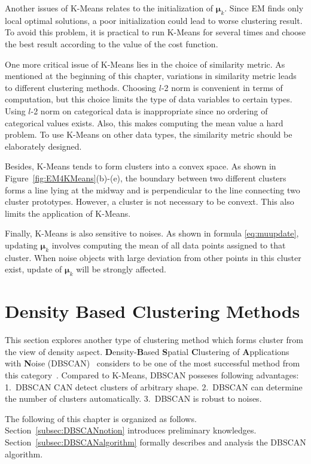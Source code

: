 Another issues of K-Means relates to the initialization of \(\boldsymbol{\mu}_k\). Since EM finds only local optimal solutions, a poor initialization could lead to worse clustering result. To avoid this problem, it is practical to run K-Means for several times and choose the best result according to the value of the cost function.

One more critical issue of K-Means lies in the choice of similarity metric. As mentioned at the beginning of this chapter, variations in similarity metric leads to different clustering methods. Choosing \(l\)-2 norm is convenient in terms of computation, but this choice limits the type of data variables to certain types. Using \(l\)-2 norm on categorical data is inappropriate since no ordering of categorical values exists. Also, this makes computing the mean value a hard problem. To use K-Means on other data types, the similarity metric should be elaborately designed. 

Besides, K-Means tends to form clusters into a convex space. As shown in Figure~\ref{fig:EM4KMeans}(b)-(e), the boundary between two different clusters forms a line lying at the midway and is perpendicular to the line connecting two cluster prototypes. However, a cluster is not necessary to be convext. This also limits the application of K-Means.

Finally, K-Means is also sensitive to noises. As shown in formula \ref{eq:muupdate}, updating \(\boldsymbol{\mu}_k\) involves computing the mean of all data points assigned to that cluster. When noise objects with large deviation from other points in this cluster exist, update of \(\boldsymbol{\mu}_k\) will be strongly affected. 

\section{Density Based Clustering Methods}
This section explores another type of clustering method which forms cluster from the view of density aspect. \textbf{D}ensity-\textbf{B}ased \textbf{S}patial \textbf{C}lustering of \textbf{A}pplications with \textbf{N}oise (DBSCAN)~\cite{ester1996density} considers to be one of the most successful method from this category~\cite{2014timeaward}. Compared to K-Means, DBSCAN posseses following advantages: 1.\ DBSCAN CAN detect clusters of arbitrary shape. 2.\ DBSCAN can determine the number of clusters automatically. 3.\ DBSCAN is robust to noises. 

The following of this chapter is organized as follows. Section~\ref{subsec:DBSCANnotion} introduces preliminary knowledges. Section~\ref{subsec:DBSCANalgorithm} formally describes and analysis the DBSCAN algorithm.


